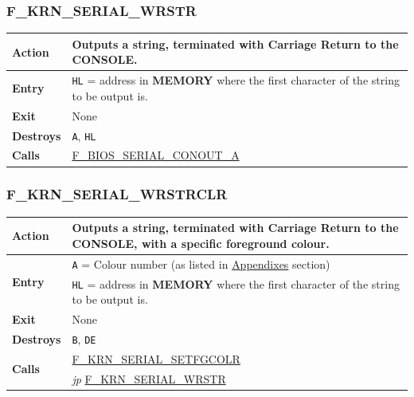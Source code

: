 \documentclass[a4paper,11pt]{article}
\begin{document}
        \subsubsection{F\_KRN\_SERIAL\_WRSTR}
        \label{func:fkrnserialwrstr}
        \begin{tabular}{l p{9cm}}
            \hline\multirow[t]{4}{4em}{\textbf{Action}}
            & Outputs a string, terminated with Carriage Return to the 
            \textbf{CONSOLE}.\\
            \hline\textbf{Entry} 
            & \texttt{HL} = address in \textbf{MEMORY} where the first character
            of the string to be output is.\\
            \hline\textbf{Exit} & None \\
            \hline\textbf{Destroys} & \texttt{A}, \texttt{HL} \\
            \hline\textbf{Calls}
            & \hyperref[func:fbiosserialconouta]{F\_BIOS\_SERIAL\_CONOUT\_A}\\
            \hline
        \end{tabular}

        \subsubsection{F\_KRN\_SERIAL\_WRSTRCLR}
        \label{func:fkrnserialwrstrclr}
        \begin{tabular}{l p{9cm}}
            \hline\textbf{Action}
            & Outputs a string, terminated with Carriage Return to the 
            \textbf{CONSOLE}, with a specific foreground colour. \\
            \hline\multirow[t]{2}{4em}{\textbf{Entry}}
            & \texttt{A} = Colour number (as listed in 
            \hyperref[sec:appendixes]{Appendixes} section) \\
            & \texttt{HL} = address in \textbf{MEMORY} where the first character
            of the string to be output is.\\
            \hline\textbf{Exit} & None \\
            \hline\textbf{Destroys} & \texttt{B}, \texttt{DE} \\
            \hline\multirow[t]{2}{4em}{\textbf{Calls}} 
            & \hyperref[func:fkrnserialsetfgcolr]{F\_KRN\_SERIAL\_SETFGCOLR}\\
            & \textit{jp} \hyperref[func:fkrnserialwrstr]{F\_KRN\_SERIAL\_WRSTR}\\
            \hline
        \end{tabular}
\end{document}
